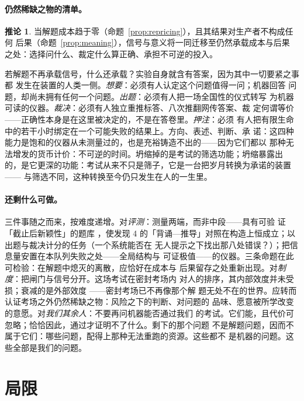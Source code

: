 \documentclass[11pt,UTF8]{ctexart}
\theoremstyle{definition}
\newtheorem*{relocationcor}{推论}
\begin{document}
\paragraph{仍然稀缺之物的清单。}
\begin{relocationcor}
当解题成本趋于零（命题~\ref{prop:repricing}），且其结果对生产者不构成任何
后果（命题~\ref{prop:meaning}），信号与意义将一同迁移至仍然承载成本与后果
之处：选择问什么、裁定什么算正确、承担不可逆的投入。
\end{relocationcor}
若解题不再承载信号，什么还承载？实验自身就含有答案，因为其中一切要紧之事都
发生在装置的人类一侧。\emph{想要}：必须有人认定这个问题值得一问；机器回答
问题，却尚未拥有任何一个问题。\emph{出题}：必须有人把一场全国性的仪式转写
为机器可读的仪器。\emph{裁决}：必须有人独立重推标答、八次推翻网传答案、裁
定何谓等价——正确性本身是在这里被决定的，不是在答卷里。\emph{押注}：必须
有人把有限生命中的若干小时绑定在一个可能失败的结果上。方向、表述、判断、承
诺：这四种能力是饱和的仪器从未测量过的，也是充裕铸造不出的——因为它们都以
那种无法增发的货币计价：不可逆的时间。坍缩掉的是考试的筛选功能；坍缩暴露出
的，是它更深的功能：考试从来不只是筛子，它是一台把岁月转换为承诺的装置——
与筛选不同，这种转换至今仍只发生在人的一生里。

\paragraph{还剩什么可做。}
三件事随之而来，按难度递增。对\emph{评测}：测量两端，而非中段——具有可验
证「截止后新颖性」的题库
\citep{white2025livebench,balunovic2025matharena}，使发现 4
的「背诵—推导」对照在构造上恒成立；以出题与裁决计分的任务（一个系统能否在
无人提示之下找出那八处错误？）；把信息量安置在本队列失败之处——全局结构与
可证极值——的仪器。三条命题在此可检验：在解题中熄灭的离散，应恰好在成本与
后果留存之处重新出现。对\emph{制度}：把闸门与信号分开。这场考试在密封考场内
对人的排序，其内部效度并未受损；衰减的是外部效度
\citep{messick1989validity}——密封考场已不再像那个解
题无处不在的世界。应转而认证考场之外仍然稀缺之物：风险之下的判断、对问题的
品味、愿意被所学改变的意愿。对\emph{我们其余人}：不要再问机器能否通过我们
的考试。它们能，且代价可忽略；恰恰因此，通过才证明不了什么。剩下的那个问题
不是解题问题，因而不属于它们：哪些问题，配得上那种无法重跑的资源。这些都不
是机器的问题。这些全部是我们的问题。

\section{局限}
\end{document}

